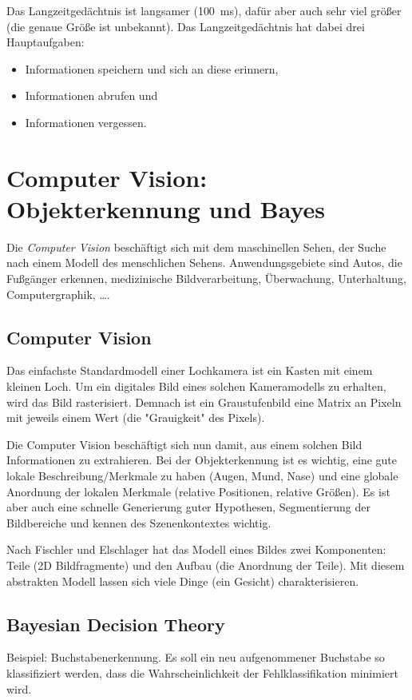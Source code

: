 			Das Langzeitgedächtnis ist langsamer (\ca \SI{100}{\milli\second}), dafür aber auch sehr viel größer (die genaue Größe ist unbekannt). Das Langzeitgedächtnis hat dabei drei Hauptaufgaben:
			\begin{itemize}
				\item Informationen speichern und sich an diese erinnern,
				\item Informationen abrufen und
				\item Informationen vergessen.
			\end{itemize}

\chapter{Computer Vision: Objekterkennung und Bayes}
	Die \emph{Computer Vision} beschäftigt sich mit dem maschinellen Sehen, \dh der Suche nach einem Modell des menschlichen Sehens. Anwendungsgebiete sind \bspw Autos, die Fußgänger erkennen, medizinische Bildverarbeitung, Überwachung, Unterhaltung, Computergraphik, \dots.

	\section{Computer Vision}
		Das einfachste Standardmodell einer Lochkamera ist ein Kasten mit einem kleinen Loch. Um ein digitales Bild eines solchen Kameramodells zu erhalten, wird das Bild rasterisiert. Demnach ist ein Graustufenbild eine Matrix an Pixeln mit jeweils einem Wert (die "Grauigkeit" des Pixels).
		
		Die Computer Vision beschäftigt sich nun damit, aus einem solchen Bild Informationen zu extrahieren. Bei der Objekterkennung ist es wichtig, eine gute lokale Beschreibung/Merkmale zu haben (\zB Augen, Mund, Nase) und eine globale Anordnung der lokalen Merkmale (\zB relative Positionen, relative Größen). Es ist aber auch eine schnelle Generierung guter Hypothesen, Segmentierung der Bildbereiche und kennen des Szenenkontextes wichtig.
		
		Nach Fischler und Elschlager hat das Modell eines Bildes zwei Komponenten: Teile (2D Bildfragmente) und den Aufbau (die Anordnung der Teile). Mit diesem abstrakten Modell lassen sich viele Dinge (\zB ein Gesicht) charakterisieren.

	\section{Bayesian Decision Theory}
		Beispiel: Buchstabenerkennung. Es soll ein neu aufgenommener Buchstabe so klassifiziert werden, dass die Wahrscheinlichkeit der Fehlklassifikation minimiert wird.

